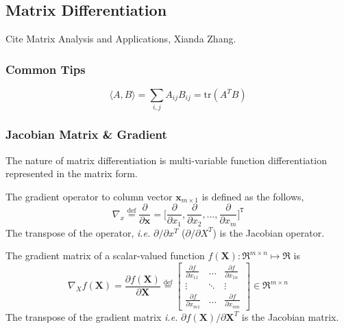 




\subsection{Matrix Differentiation}

Cite Matrix Analysis and Applications, Xianda Zhang.

 \subsubsection{Common Tips}

 $$\langle A,B \rangle=\sum_{i,j}A_{ij}B_{ij}=\text{tr}(A^TB)$$

 \subsubsection{Jacobian Matrix \& Gradient}


 The nature of matrix differentiation is multi-variable function
 differentiation represented in the matrix form.

 The gradient operator to column vector $\mathbf{x}_{m\times 1}$ is defined as the follows,
 $$\nabla_x \overset{\text{def}}{=} \frac{\partial}{\partial \mathbf{x}} = \big[
	 \frac{\partial}{\partial x_1}, \frac{\partial}{\partial x_2},
	 \ldots, \frac{\partial}{\partial x_m} \big]^\mathtt{T} $$
 The transpose of the operator, {\it i.e.} $\partial /\partial x^T$ ($\partial /\partial X^T$)
 is the Jacobian operator.

 The gradient matrix of a scalar-valued function $f(\mathbf{X}): \Re^{m\times n} \mapsto \Re$ is
 $$ \nabla_X f(\mathbf{X}) =
    \frac{\partial f(\mathbf{X})}{\partial \mathbf{X}} \overset{\text{def}}{=} \begin{bmatrix}
	 \frac{\partial f}{\partial x_{11}} & \ldots & \frac{\partial f}{\partial x_{1n}} \\
	\vdots & \ddots & \vdots \\ \frac{\partial f}{\partial x_{m1}} & \ldots &
	\frac{\partial f}{\partial x_{mn}} \end{bmatrix} \in \Re^{m\times n}$$
 The transpose of the gradient matrix {\it i.e.} $\partial f(\mathbf{X})/\partial \mathbf{X}^T$
 is the Jacobian matrix.


